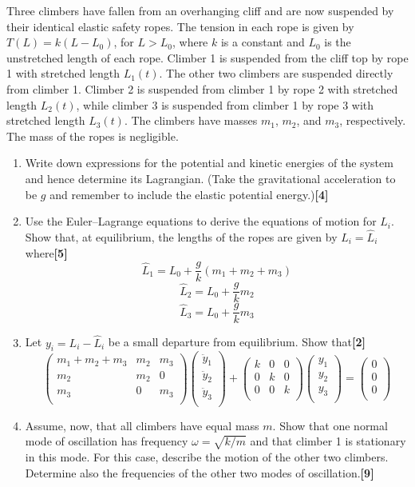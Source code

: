 \documentclass[a4paper]{article}
\begin{document}
\begin{qns}
Three climbers have fallen from an overhanging cliff and are now suspended by their identical elastic safety ropes. The tension in each rope is given by $T(L) = k(L − L_0)$, for $L > L_0$, where $k$ is a constant and $L_0$ is the unstretched length of each rope. Climber 1 is suspended from the cliff top by rope 1 with stretched length $L_1(t)$. The other two climbers are suspended directly from climber 1. Climber 2 is suspended from climber 1 by rope 2 with stretched length $L_2(t)$, while climber 3 is suspended from climber 1 by rope 3 with stretched length $L_3(t)$. The climbers have masses $m_1$, $m_2$, and $m_3$, respectively. The mass of the ropes is negligible.
\begin{enumerate}[label=(\alph*)]
\item Write down expressions for the potential and kinetic energies of the system and hence determine its Lagrangian. (Take the gravitational acceleration to be $g$ and remember to include the elastic potential energy.)\hfill\textbf{[4]}
\item Use the Euler–Lagrange equations to derive the equations of motion for $L_i$. Show that, at equilibrium, the lengths of the ropes are given by $L_i = \hat{L}_i$ where\hfill\textbf{[5]}
$$\hat{L}_1=L_0+\frac{g}{k}(m_1+m_2+m_3)$$
$$\hat{L}_2=L_0+\frac{g}{k}m_2$$
$$\hat{L}_3=L_0+\frac{g}{k}m_3$$
\item Let $y_i=L_i-\hat{L}_i$ be a small departure from equilibrium. Show that\hfill\textbf{[2]}
$$\begin{pmatrix}m_1+m_2+m_3&m_2&m_3\\m_2&m_2&0\\m_3&0&m_3\\\end{pmatrix}\begin{pmatrix}\ddot{y}_1\\\ddot{y}_2\\\ddot{y}_3\\\end{pmatrix}+\begin{pmatrix}k&0&0\\0&k&0\\0&0&k\\\end{pmatrix}\begin{pmatrix}y_1\\y_2\\y_3\\\end{pmatrix}=\begin{pmatrix}0\\0\\0\\\end{pmatrix}$$
\item Assume, now, that all climbers have equal mass $m$. Show that one normal mode of oscillation has frequency $\omega=\sqrt{k/m}$ and that climber 1 is stationary in this mode. For this case, describe the motion of the other two climbers. Determine also the frequencies of the other two modes of oscillation.\hfill\textbf{[9]}
\end{enumerate}
\end{qns}
\end{document}
